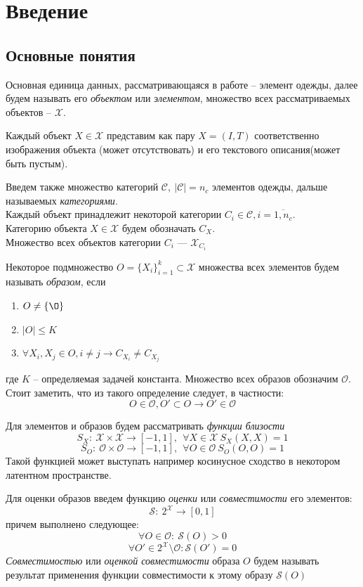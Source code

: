 \documentclass[a4paper,12pt]{article}
\begin{document}
	\section{Введение}
		\subsection{Основные понятия}
			Основная единица данных, рассматривающаяся в работе -- элемент одежды, далее будем называть его \textit{объектом} или \textit{элементом}, множество всех рассматриваемых объектов -- $\mathcal{X}$. 
			
			Каждый объект $X\in\mathcal{X}$ представим как пару $X = (I, T)$ соответственно изображения объекта (может отсутствовать) и его текстового описания(может быть пустым). 
			
			Введем также множество категорий $\mathcal{C}, ~|\mathcal{C}| = n_c$ элементов одежды, дальше называемых \textit{категориями}. \\
			Каждый объект принадлежит некоторой категории $C_i\in\mathcal{C}, i=\overline{1,n_c}$. \\
			Категорию объекта $X\in\mathcal{X}$ будем обозначать $C_X$. \\
			Множество всех объектов категории $C_i$ --- $\mathcal{X}_{C_i}$
			
			Некоторое подмножество $O = \{X_i\}_{i=1}^k\subset \mathcal{X}$ множества всех элементов будем называть \textit{образом}, если
			\begin{enumerate}
				\item $O\neq\{\O\}$
				\item $|O| \leqslant K$
				\item $\forall X_i, X_j \in O, i\neq j\longrightarrow C_{X_i} \neq C_{X_j}$
			\end{enumerate}
		    где $K$ -- определяемая задачей константа. 
			Множество всех образов обозначим $\mathcal{O}$. 
			Стоит заметить, что из такого определение следует, в частности:
		    $$O\in\mathcal{O}, O'\subset O \longrightarrow O'\in\mathcal{O}$$
		    
			Для элементов и образов будем рассматривать \textit{функции близости}
				$$S_X:~\mathcal{X}\times \mathcal{X}\longrightarrow [-1,1], ~~\forall X\in\mathcal{X}~S_X(X,X) = 1$$
				$$S_O:~\mathcal{O}\times \mathcal{O}\longrightarrow [-1,1], ~~\forall O\in\mathcal{O}~S_O(O,O) = 1$$
			Такой функцией может выступать например косинусное сходство в некотором латентном пространстве.
				
			Для оценки образов введем функцию \textit{оценки} или \textit{совместимости} его элементов: 
			$$\mathcal{S}:~2^\mathcal{X}\longrightarrow [0,1]$$
			 причем выполнено следующее:
			$$\forall O \in \mathcal{O}:~\mathcal{S}(O) > 0$$
			$$\forall O' \in 2^\mathcal{X} \setminus \mathcal{O}: \mathcal{S}(O') =0$$
			\textit{Совместимостью} или \textit{оценкой совместимости} образа $O$ будем называть результат применения функции совместимости к этому образу $\mathcal{S}(O)$
			
\end{document}
